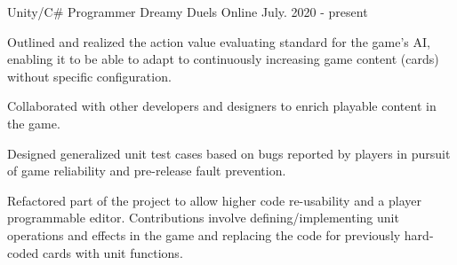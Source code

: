 

\begin{cventries}

  \cventry
    {Unity/C\# Programmer} %
    {Dreamy Duels} %
    {Online} %
    {July. 2020 - present} %
    {
      \begin{cvitems} %
		\item Outlined and realized the action value evaluating standard for the game’s AI, enabling it to be able to adapt to continuously increasing game content (cards) without specific configuration.
		\item Collaborated with other developers and designers to enrich playable content in the game.
		\item Designed generalized unit test cases based on bugs reported by players in pursuit of game reliability and pre-release fault prevention.
		\item Refactored part of the project to allow higher code re-usability and a player programmable editor. Contributions involve defining/implementing unit operations and effects in the game and replacing the code for previously hard-coded cards with unit functions.
      \end{cvitems}
    }

\end{cventries}
